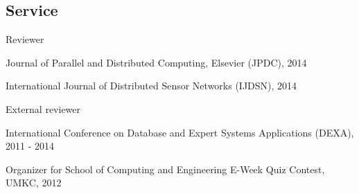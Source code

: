 \documentclass[margin,line]{resume}
\begin{document}
\begin{resume}
    \section{\mysidestyle Service}
    \begin{list2}
    \item Reviewer
    \begin{list3}
    \item Journal of Parallel and Distributed Computing, Elsevier (JPDC), 2014
    \item International Journal of Distributed Sensor Networks (IJDSN), 2014
    \end{list3}
    \item External reviewer
    \begin{list3}
    \item International Conference on Database and Expert Systems Applications (DEXA), 2011 - 2014
    \end{list3}
    \item Organizer for School of Computing and Engineering E-Week Quiz Contest, UMKC, 2012
    \end{list2}
 
\end{resume}
\end{document}
